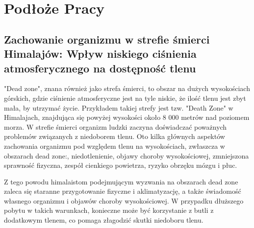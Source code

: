 \chapter{Podłoże Pracy}
\section{Zachowanie organizmu w strefie śmierci Himalajów: Wpływ niskiego ciśnienia atmosferycznego na dostępność tlenu}
"Dead zone", znana również jako strefa śmierci, to obszar na dużych wysokościach górskich, gdzie ciśnienie atmosferyczne jest na tyle niskie, że ilość tlenu jest zbyt mała, by utrzymać życie. Przykładem takiej strefy jest tzw. "Death Zone" w Himalajach, znajdująca się powyżej wysokości około 8 000 metrów nad poziomem morza. W strefie śmierci organizm ludzki zaczyna doświadczać poważnych problemów związanych z niedoborem tlenu. Oto kilka głównych aspektów zachowania organizmu pod względem tlenu na wysokościach, zwłaszcza w obszarach dead zone:, niedotlenienie, objawy choroby wysokościowej, zmniejszona sprawność fizyczna, zespół cienkiego powietrza, ryzyko obrzęku mózgu i płuc. \cite{deathzone}

Z tego powodu himalaistom podejmującym wyzwania na obszarach dead zone zaleca się staranne przygotowanie fizyczne i aklimatyzację, a także świadomość własnego organizmu i objawów choroby wysokościowej. W przypadku dłuższego pobytu w takich warunkach, konieczne może być korzystanie z butli z dodatkowym tlenem, co pomaga złagodzić skutki niedoboru tlenu.

